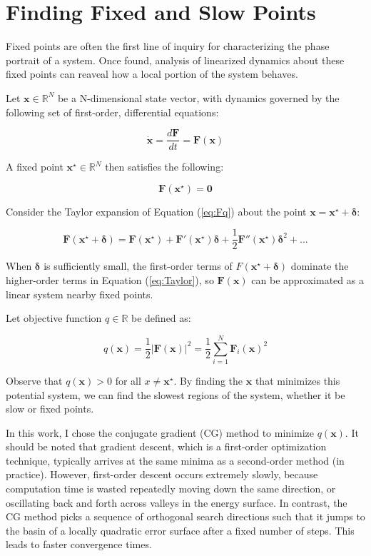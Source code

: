 \documentclass{article} %
\newcommand{\bf}[1]{\mathbf{#1}}
\newcommand{\x}{\bf{x}}
\newcommand{\xstar}{\bf{x^\star}}
\newcommand{\F}{\bf{F}}
\begin{document}
\section{Finding Fixed and Slow Points}

Fixed points are often the first line of inquiry for characterizing the phase portrait of a system. Once found, analysis of linearized dynamics about these fixed points can reaveal how a local portion of the system behaves.

Let $\x \in \mathbb{R}^N$ be a N-dimensional state vector, with dynamics governed by the following set of first-order, differential equations:

\begin{equation}
\dot{\x} = \frac{d\F}{dt} = \F(\x)
\end{equation}

A fixed point $\xstar \in \mathbb{R}^N$ then satisfies the following:

\begin{equation} \label{eq:Fq}
  \F(\xstar) = \bf{0}
\end{equation}

Consider the Taylor expansion of Equation (\ref{eq:Fq}) about the point $\x = \xstar+\bf{\delta}$:

\begin{equation} \label{eq:Taylor}
  \F(\xstar+\bf{\delta}) = \F(\xstar) + \F'(\xstar)\bf{\delta} + \frac{1}{2}\F''(\xstar)\bf{\delta}^2 +...
\end{equation}

When $\bf{\delta}$ is sufficiently small, the first-order terms of $F(\xstar+\bf{\delta})$ dominate the higher-order terms in Equation (\ref{eq:Taylor}), so $\F(\x)$ can be approximated as a linear system nearby fixed points.

Let objective function $q \in \mathbb{R}$ be defined as:

\begin{equation} \label{eq:q}
  q(\x)=\frac{1}{2}{|\F(\x)|^2}=\frac{1}{2}\sum_{i=1}^{N}{\F_i(\x)^2}
\end{equation}

Observe that $q(\x) > 0$ for all $x \neq \xstar$. By finding the $\x$ that minimizes this potential system, we can find the slowest regions of the system, whether it be slow or fixed points.

In this work, I chose the conjugate gradient (CG) method to minimize $q(\x)$. It should be noted that gradient descent, which is a first-order optimization technique, typically arrives at the same minima as a second-order method (in practice). However, first-order descent occurs extremely slowly, because computation time is wasted repeatedly moving down the same direction, or oscillating back and forth across valleys in the energy surface. In contrast, the CG method picks a sequence of orthogonal search directions such that it jumps to the basin of a locally quadratic error surface after a fixed number of steps. This leads to faster convergence times.
\end{document}
